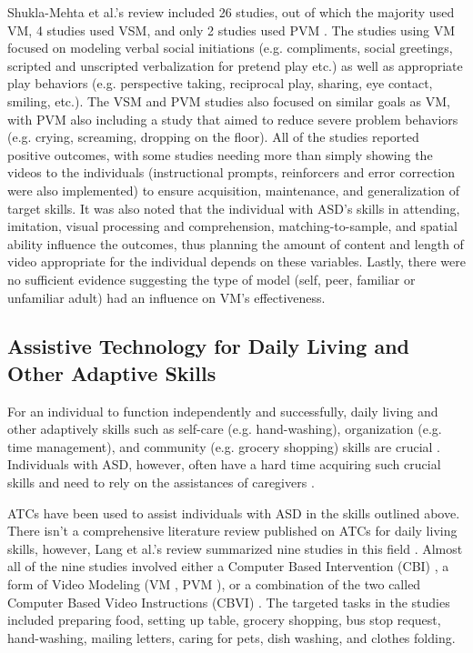 \documentclass{ut-thesis}
\begin{document}
Shukla-Mehta et al.'s review included 26 studies, out of which the majority used VM, 4 studies used VSM, and only 2 studies used PVM \cite{shukla2009evaluating}.  The studies using VM focused on modeling verbal social initiations (e.g. compliments, social greetings, scripted and unscripted verbalization for pretend play etc.) as well as appropriate play behaviors (e.g. perspective taking, reciprocal play, sharing, eye contact, smiling, etc.).  The VSM and PVM studies also focused on similar goals as VM, with PVM also including a study that aimed to reduce severe problem behaviors (e.g. crying, screaming, dropping on the floor).  All of the studies reported positive outcomes, with some studies needing more than simply showing the videos to the individuals (instructional prompts, reinforcers and error correction were also implemented) to ensure acquisition, maintenance, and generalization of target skills.  It was also noted that the individual with ASD's skills in attending, imitation, visual processing and comprehension, matching-to-sample, and spatial ability influence the outcomes, thus planning the amount of content and length of video appropriate for the individual depends on these variables.  Lastly, there were no sufficient evidence suggesting the type of model (self, peer, familiar or unfamiliar adult) had an influence on VM's effectiveness.

\subsection{Assistive Technology for Daily Living and Other Adaptive Skills}
For an individual to function independently and successfully, daily living and other adaptively skills such as self-care (e.g. hand-washing), organization (e.g. time management), and community (e.g. grocery shopping) skills are crucial \cite{liss2001predictors}.  Individuals with ASD, however, often have a hard time acquiring such crucial skills and need to rely on the assistances of caregivers \cite{smith2012developmental}.

ATCs have been used to assist individuals with ASD in the skills outlined above.  There isn't a comprehensive literature review published on ATCs for daily living skills, however, Lang et al.'s review summarized nine studies in this field \cite{lang2014assistive}.  Almost all of the nine studies involved either a Computer Based Intervention (CBI) \cite{hutcherson2004computer}, a form of Video Modeling (VM \cite{rosenberg2010evaluating}, PVM \cite{bereznak2012video, shipley2002teaching, sigafoos2007evaluation, sigafoos2005computer, van2010comparison}), or a combination of the two called Computer Based Video Instructions (CBVI) \cite{ayres2009acquisition, mechling2010computer}.  The targeted tasks in the studies included preparing food, setting up table, grocery shopping, bus stop request, hand-washing, mailing letters, caring for pets, dish washing, and clothes folding.
\end{document}
